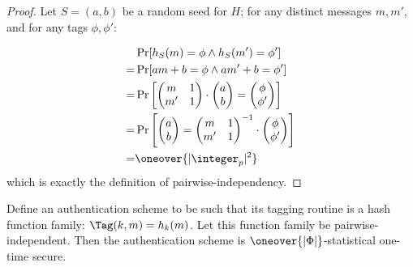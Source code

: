 \begin{proof}
    Let $S = (a, b)$ be a random seed for $H$; for any distinct messages $m, m'$, and for any tags $\phi, \phi'$:

    \begin{align*}
        & \Pr[h_S(m) = \phi \wedge h_S(m') = \phi'] \\
        =& \Pr[am + b = \phi \wedge am' + b = \phi'] \\
        =& \Pr\left[
        \begin{pmatrix}
            m & 1 \\
            m' & 1
        \end{pmatrix}
        \cdot
        \begin{pmatrix}
            a \\
            b
        \end{pmatrix}
        =
        \begin{pmatrix}
            \phi \\
            \phi'
        \end{pmatrix}
        \right] \\
        =& \Pr\left[
        \begin{pmatrix}
            a \\
            b
        \end{pmatrix}
        =
        \begin{pmatrix}
            m & 1 \\
            m' & 1
        \end{pmatrix}^{-1}
        \cdot
        \begin{pmatrix}
            \phi \\
            \phi'
        \end{pmatrix}
        \right] \\
        =& \oneover{|\integer_p|^2}
    \end{align*}
    which is exactly the definition of pairwise-independency.
\end{proof}

\begin{theorem}
    Define an authentication scheme to be such that its tagging routine is a hash function family: $\Tag(k, m) = h_k(m)$. Let this function family be pairwise-independent. Then the authentication scheme is $\oneover{|\Phi|}$-statistical one-time secure. 
\end{theorem}

